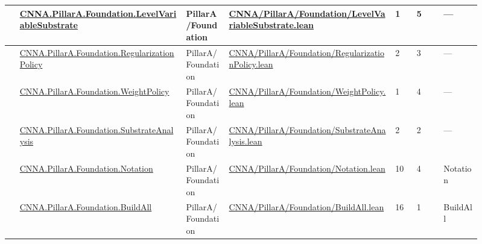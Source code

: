 \begin{longtable}{L{0.025\linewidth} L{0.315\linewidth} L{0.08\linewidth} L{0.315\linewidth} L{0.045\linewidth} L{0.055\linewidth} L{0.07\linewidth}}
\hline
{} & \href{run:repo_snapshot/CNNA/PillarA/Foundation/LevelVariableSubstrate.lean}{CNNA.\allowbreak{}PillarA.\allowbreak{}Foundation.\allowbreak{}LevelVariableSubstrate} & PillarA/\allowbreak{}Foundation & \href{run:repo_snapshot/CNNA/PillarA/Foundation/LevelVariableSubstrate.lean}{CNNA/\allowbreak{}PillarA/\allowbreak{}Foundation/\allowbreak{}LevelVariableSubstrate.\allowbreak{}lean} & 1 & 5 & ---\\
\hline
{} & \href{run:repo_snapshot/CNNA/PillarA/Foundation/RegularizationPolicy.lean}{CNNA.\allowbreak{}PillarA.\allowbreak{}Foundation.\allowbreak{}RegularizationPolicy} & PillarA/\allowbreak{}Foundation & \href{run:repo_snapshot/CNNA/PillarA/Foundation/RegularizationPolicy.lean}{CNNA/\allowbreak{}PillarA/\allowbreak{}Foundation/\allowbreak{}RegularizationPolicy.\allowbreak{}lean} & 2 & 3 & ---\\
\hline
{} & \href{run:repo_snapshot/CNNA/PillarA/Foundation/WeightPolicy.lean}{CNNA.\allowbreak{}PillarA.\allowbreak{}Foundation.\allowbreak{}WeightPolicy} & PillarA/\allowbreak{}Foundation & \href{run:repo_snapshot/CNNA/PillarA/Foundation/WeightPolicy.lean}{CNNA/\allowbreak{}PillarA/\allowbreak{}Foundation/\allowbreak{}WeightPolicy.\allowbreak{}lean} & 1 & 4 & ---\\
\hline
{} & \href{run:repo_snapshot/CNNA/PillarA/Foundation/SubstrateAnalysis.lean}{CNNA.\allowbreak{}PillarA.\allowbreak{}Foundation.\allowbreak{}SubstrateAnalysis} & PillarA/\allowbreak{}Foundation & \href{run:repo_snapshot/CNNA/PillarA/Foundation/SubstrateAnalysis.lean}{CNNA/\allowbreak{}PillarA/\allowbreak{}Foundation/\allowbreak{}SubstrateAnalysis.\allowbreak{}lean} & 2 & 2 & ---\\
\hline
{} & \href{run:repo_snapshot/CNNA/PillarA/Foundation/Notation.lean}{CNNA.\allowbreak{}PillarA.\allowbreak{}Foundation.\allowbreak{}Notation} & PillarA/\allowbreak{}Foundation & \href{run:repo_snapshot/CNNA/PillarA/Foundation/Notation.lean}{CNNA/\allowbreak{}PillarA/\allowbreak{}Foundation/\allowbreak{}Notation.\allowbreak{}lean} & 10 & 4 & Notation\\
\hline
{} & \href{run:repo_snapshot/CNNA/PillarA/Foundation/BuildAll.lean}{CNNA.\allowbreak{}PillarA.\allowbreak{}Foundation.\allowbreak{}BuildAll} & PillarA/\allowbreak{}Foundation & \href{run:repo_snapshot/CNNA/PillarA/Foundation/BuildAll.lean}{CNNA/\allowbreak{}PillarA/\allowbreak{}Foundation/\allowbreak{}BuildAll.\allowbreak{}lean} & 16 & 1 & BuildAll\\

\end{longtable}
